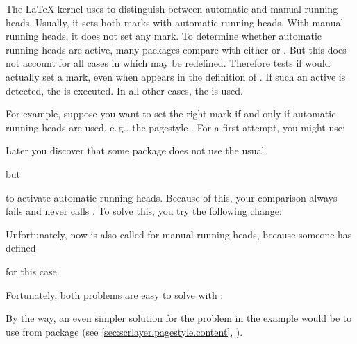 \begin{Declaration}
\end{Declaration}
The \LaTeX{} kernel uses
 to
distinguish between automatic and manual running heads. Usually, it sets both
marks with automatic running heads. With manual running heads, it does not set
any mark. To determine whether automatic running heads are active, many
packages compare  with either
 or . But
this does not account for all cases in which 
may be redefined. Therefore  tests if
 would actually set a mark, even when
 appears in the definition of . If
such an active  is detected, the
 is executed. In all other cases, the  is
used.%
\begin{Example}
  For example, suppose you want to set the right mark if and only if
  automatic running heads are used, e.\,g., the pagestyle
  . For a first attempt,
  you might use:
\begin{lstcode}
  \ifx\@mkboth\markboth {}\fi
\end{lstcode}
  Later you discover that some package does not use the usual
\begin{lstcode}
  \let\@mkboth\markboth
\end{lstcode}
  but
\begin{lstcode}
  \renewcommand{\@mkboth}{\markboth}
\end{lstcode}
  to activate automatic running heads. Because of this, your comparison always
  fails and never calls . To solve this, you
  try the following change:
\begin{lstcode}
  \ifx\@mkboth\@gobbletwo\else {}\fi
\end{lstcode}
  Unfortunately, now  is also called for
  manual running heads, because someone has defined
\begin{lstcode}
  \renewcommand{\@mkboth}[2]{%
    \typeout{DEBUG: ignoring running head setting}%
  }
\end{lstcode}
  for this case.

  Fortunately, both problems are easy to solve with :
\begin{lstcode}
\end{lstcode}%
\end{Example}
By the way, an even simpler solution for the problem in the example
would be to use  from package
\hyperref[cha:scrlayer]{} (see
\autoref{sec:scrlayer.pagestyle.content},
).%
\EndIndexGroup


